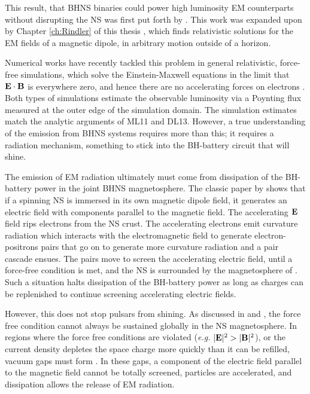 This result, that BHNS binaries could power high luminosity EM counterparts
without disrupting the NS was first put forth by \cite[][]{McL:2011}. This
work was expanded upon by Chapter \ref{ch:Rindler} of this thesis
\cite[][]{DL:2013}, which finds relativistic solutions for the EM fields of
a magnetic dipole, in arbitrary motion outside of a horizon.

Numerical works have recently tackled this problem in general relativistic,
force-free simulations, which solve the Einstein-Maxwell equations in the
limit that ${\bf E} \cdot {\bf B}$ is everywhere zero, and hence there are no
accelerating forces on electrons \citep{Paschalidis:2013}. Both types of
simulations estimate the observable luminosity via a Poynting flux measured at
the outer edge of the simulation domain. The simulation estimates match the
analytic arguments of ML11 and DL13. However, a true understanding of the
emission from BHNS systems requires more than this; it requires a radiation
mechanism, something to stick into the BH-battery circuit that will shine.

The emission of EM radiation ultimately must come from dissipation of the BH-
battery power in the joint BHNS magnetosphere. The classic paper by
\cite{GJ:1969} shows that if a spinning NS is immersed in its own magnetic
dipole field, it generates an electric field with components parallel to the
magnetic field. The accelerating ${\bf E}$ field rips electrons from the NS
crust. The accelerating electrons emit curvature radiation which interacts
with the electromagnetic field to generate electron-positrons pairs that go on
to generate more curvature radiation and a pair cascade ensues. The pairs move
to screen the accelerating electric field, until a force-free condition is
met, and the NS is surrounded by the magnetosphere of \citep{GJ:1969}. Such a
situation halts dissipation of the BH-battery power as long as charges can be
replenished to continue screening accelerating electric fields.

However, this does not stop pulsars from shining. As discussed in
\citep{Sturrock:1971} and \citep{RudSuth:1975}, the force free condition
cannot always be sustained globally in the NS magnetosphere. In regions where
the force free conditions are violated (\emph{e.g.} $|{\bf E}|^2 > |{\bf B}|^2$),
or the current density depletes the space charge more quickly than it can be
refilled, vacuum gaps must form \citep[\emph{e.g.}][]{DaughertyHarding:1982,
ChengRuderman:1986}. In these gaps, a component of the electric field parallel
to the magnetic field cannot be totally screened, particles are accelerated,
and dissipation allows the release of EM radiation.

